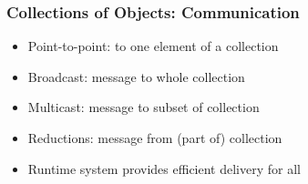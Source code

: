 \begin{frame}[fragile]
  \frametitle{Collections of Objects: Communication}
  \begin{itemize}
    \item Point-to-point: to one element of a collection
    \item Broadcast: message to whole collection
    \item Multicast: message to subset of collection
    \item Reductions: message from (part of) collection
    \item Runtime system provides efficient delivery for all
  \end{itemize}
\end{frame}



